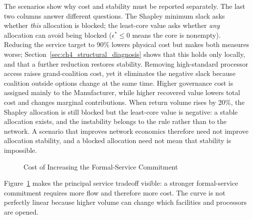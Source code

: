 The scenarios show why cost and stability must be reported separately. The last two columns answer different questions. The Shapley minimum slack asks whether \emph{this} allocation is blocked; the least-core value asks whether \emph{any} allocation can avoid being blocked ($\epsilon^*\leq0$ means the core is nonempty). Reducing the service target to 90\% lowers physical cost but makes both measures worse; Section~\ref{sec:ch4_structural_diagnosis} shows that this holds only locally, and that a further reduction restores stability. Removing high-standard processor access raises grand-coalition cost, yet it eliminates the negative slack because coalition outside options change at the same time. Higher governance cost is assigned mainly to the Manufacturer, while higher recovered value lowers total cost and changes marginal contributions. When return volume rises by 20\%, the Shapley allocation is still blocked but the least-core value is negative: a stable allocation exists, and the instability belongs to the rule rather than to the network. A scenario that improves network economics therefore need not improve allocation stability, and a blocked allocation need not mean that stability is impossible.

\begin{figure}[htbp]
\centering
{}
\caption{Cost of Increasing the Formal-Service Commitment}
\label{fig:ch4_service_sensitivity}
\end{figure}

Figure~\ref{fig:ch4_service_sensitivity} makes the principal service tradeoff visible: a stronger formal-service commitment requires more flow and therefore more cost. The curve is not perfectly linear because higher volume can change which facilities and processors are opened.

